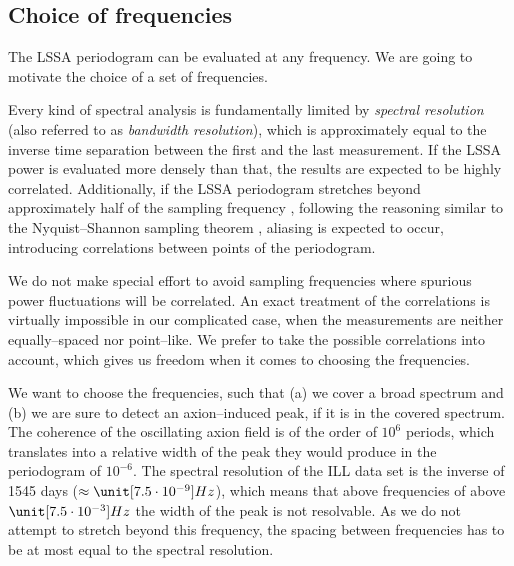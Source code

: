 \subsection{Choice of frequencies}
The LSSA periodogram can be evaluated at any frequency. We are going to motivate the choice of a set of frequencies.

Every kind of spectral analysis is fundamentally limited by \emph{spectral resolution} (also referred to as \emph{bandwidth resolution}), which is approximately equal to the inverse time separation between the first and the last measurement. If the LSSA power is evaluated more densely than that, the results are expected to be highly correlated. Additionally, if the LSSA periodogram stretches beyond approximately half of the sampling frequency , following the reasoning similar to the Nyquist--Shannon sampling theorem , aliasing is expected to occur, introducing correlations between points of the periodogram.

We do not make special effort to avoid sampling frequencies where spurious power fluctuations will be correlated. An exact treatment of the correlations is virtually impossible in our complicated case, when the measurements are neither equally--spaced nor point--like. We prefer to take the possible correlations into account, which gives us freedom when it comes to choosing the frequencies.

We want to choose the frequencies, such that (a) we cover a broad spectrum and (b) we are sure to detect an axion--induced peak, if it is in the covered spectrum. The coherence of the oscillating axion field is of the order of $10^6$ periods, which translates into a relative width of the peak they would produce in the periodogram of $10^{-6}$. The spectral resolution of the ILL data set is the inverse of 1545 days ($\approx \unit[7.5 \cdot 10^{-9}]{Hz}$), which means that above frequencies of above $\unit[7.5 \cdot 10^{-3}]{Hz}$ the width of the peak is not resolvable. As we do not attempt to stretch beyond this frequency, the spacing between frequencies has to be at most equal to the spectral resolution.

